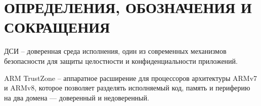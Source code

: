\section*{ОПРЕДЕЛЕНИЯ, ОБОЗНАЧЕНИЯ И СОКРАЩЕНИЯ}

ДСИ -- доверенная среда исполнения, один из современных механизмов безопасности для защиты целостности и конфиденциальности приложений.

ARM TrustZone -- аппаратное расширение для процессоров архитектуры ARMv7 и ARMv8, которое позволяет разделять исполняемый код, память и периферию на два домена --- доверенный и недоверенный.
